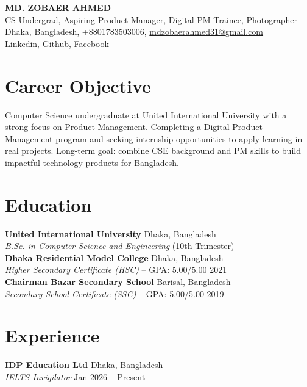 \documentclass[10pt,a4paper]{article}
\begin{document}
\begin{center}
    {\LARGE \textbf{MD. ZOBAER AHMED}} \\
    \vspace{2pt}
    CS Undergrad, Aspiring Product Manager, Digital PM Trainee, Photographer \\
    \vspace{2pt}
    Dhaka, Bangladesh, +8801783503006,
    \href{mailto:mdzobaerahmed31@gmail.com}{mdzobaerahmed31@gmail.com} \\
    \href{https://www.linkedin.com/in/mdzobaerahmed}{Linkedin},  \href{https://github.com/mdzobaerahmed}{Github}, \href{https://www.facebook.com/mdzobaerahmed31}{Facebook}
\end{center}

\vspace{-4pt}

\section*{Career Objective}
Computer Science undergraduate at United International University with a strong focus on Product Management. Completing a Digital Product Management program and seeking internship opportunities to apply learning in real projects. Long-term goal: combine CSE background and PM skills to build impactful technology products for Bangladesh.

\section*{Education}
\textbf{United International University} \hfill Dhaka, Bangladesh \\
\textit{B.Sc. in Computer Science and Engineering } \hfill (10th Trimester) \\

\textbf{Dhaka Residential Model College} \hfill Dhaka, Bangladesh \\
\textit{Higher Secondary Certificate (HSC)} -- GPA: 5.00/5.00 \hfill 2021 \\

\textbf{Chairman Bazar Secondary School} \hfill Barisal, Bangladesh \\
\textit{Secondary School Certificate (SSC)} -- GPA: 5.00/5.00 \hfill 2019

\section*{Experience}
\textbf{IDP Education Ltd} \hfill Dhaka, Bangladesh \\
\textit{IELTS Invigilator} \hfill Jan 2026 -- Present
\vspace{2mm}
\end{document}
